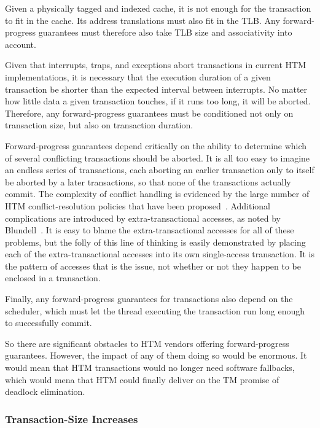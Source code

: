 Given a physically tagged and indexed cache, it is not enough for the
transaction to fit in the cache.
Its address translations must also fit in the TLB.
Any forward-progress guarantees must therefore also take TLB size
and associativity into account.

Given that interrupts, traps, and exceptions abort transactions in current
HTM implementations, it is necessary that the execution duration of
a given transaction be shorter than the expected interval between
interrupts.
No matter how little data a given transaction touches, if it runs too
long, it will be aborted.
Therefore, any forward-progress guarantees must be conditioned not only
on transaction size, but also on transaction duration.

Forward-progress guarantees depend critically on the ability to determine
which of several conflicting transactions should be aborted.
It is all too easy to imagine an endless series of transactions, each
aborting an earlier transaction only to itself be aborted by a later
transactions, so that none of the transactions actually commit.
The complexity of conflict handling is
evidenced by the large number of HTM conflict-resolution policies
that have been proposed~\cite{EgeAkpinar2011HTM2TLE,YujieLiu2011ToxicTransactions}.
Additional complications are introduced by extra-transactional accesses,
as noted by Blundell~\cite{Blundell2006TMdeadlock}.
It is easy to blame the extra-transactional accesses for all of these
problems, but the folly of this line of thinking is easily demonstrated
by placing each of the extra-transactional accesses into its own
single-access transaction.
It is the pattern of accesses that is the issue, not whether or not they
happen to be enclosed in a transaction.

Finally, any forward-progress guarantees for transactions also
depend on the scheduler, which must let the thread executing the
transaction run long enough to successfully commit.

So there are significant obstacles to HTM vendors offering forward-progress
guarantees.
However, the impact of any of them doing so would be enormous.
It would mean that HTM transactions would no longer need software
fallbacks, which would mena that HTM could finally deliver on the
TM promise of deadlock elimination.

\subsubsection{Transaction-Size Increases}
\label{sec:future:Transaction-Size Increases}

